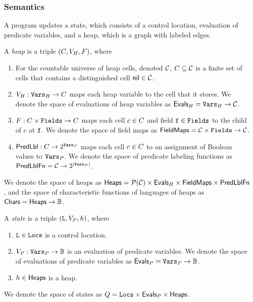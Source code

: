 \subsubsection{Semantics}
\label{sec:semantics}
%
A \lang program updates a state, which consists of a control location,
evaluation of predicate variables, and a heap, which is a graph with
labeled edges.
%
\begin{defn}
  \label{defn:states}
  A \lang \emph{heap} is a triple $(C, V_H,
  F)$, where
  \begin{enumerate}
  \item
    For the countable universe of heap cells, denoted $\mathcal{C}$,
    $C \subseteq \mathcal{C}$ is a finite set of cells that contains
    a distinguished cell $\mathsf{nil} \in \mathcal{C}$.
  \item
    $V_H: \mathtt{Vars}_H \to C$ maps each heap variable to
    the cell that it stores.
    We denote the space of evaluations of heap variables as
    $\mathsf{Evals}_H = \mathtt{Vars}_H \to \mathcal{C}$.
  \item
    $F: C \times \mathtt{Fields} \to C$ maps each cell
    $c \in C$ and field $\mathtt{f} \in \mathtt{Fields}$ to the child of
    $c$ at $\mathtt{f}$.
    We denote the space of field maps as $\mathsf{FieldMaps} = \mathcal{C} \times
    \mathtt{Fields} \to \mathcal{C}$.

  \item
    $\mathsf{PredLbl}: C \to 2^{\mathtt{Vars}_P}$ maps each cell
    $c \in C$ to an assignment of Boolean values to $\mathtt{Vars}_P$.
    We denote the space of predicate labeling functions as
    $\mathsf{PredLblFn} = \mathcal{C} \to 2^{|\mathtt{Vars}_P|}$.

  \end{enumerate}
  We denote the space of heaps as $\mathsf{Heaps} = \mathcal{P}(\mathcal{C}) \times
  \mathsf{Evals}_H \times \mathsf{FieldMaps} \times \mathsf{PredLblFn}$, and the space of
  characteristic functions of languages of heaps as $\mathsf{Chars} = \mathsf{Heaps}
  \to \mathbb{B}$.

  A \lang \emph{state} is a triple $(\mathtt{L}, V_P, h)$,
  where
  \begin{enumerate}
  \item
    $\mathtt{L} \in \mathtt{Locs}$ is a control location.
  \item
    $V_P: \mathtt{Vars}_P \to \mathbb{B}$ is an evaluation of predicate
    variables.
    We denote the space of evaluations of predicate variables as
    $\mathsf{Evals}_P = \mathtt{Vars}_P \to \mathbb{B}$.
  \item
    $h \in \mathsf{Heaps}$ is a heap.
  \end{enumerate}
  We denote the space of states as $Q = \mathtt{Locs} \times \mathsf{Evals}_P
  \times \mathsf{Heaps}$.
\end{defn}

